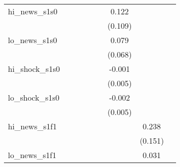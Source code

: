 {\begin{tabular}{l*{8}{c}}
\addlinespace
hi\_news\_s1s0&                     &                     &                     &                     &                     &       0.122         &                     &                     \\
            &                     &                     &                     &                     &                     &     (0.109)         &                     &                     \\
\addlinespace
lo\_news\_s1s0&                     &                     &                     &                     &                     &       0.079         &                     &                     \\
            &                     &                     &                     &                     &                     &     (0.068)         &                     &                     \\
\addlinespace
hi\_shock\_s1s0&                     &                     &                     &                     &                     &      -0.001         &                     &                     \\
            &                     &                     &                     &                     &                     &     (0.005)         &                     &                     \\
\addlinespace
lo\_shock\_s1s0&                     &                     &                     &                     &                     &      -0.002         &                     &                     \\
            &                     &                     &                     &                     &                     &     (0.005)         &                     &                     \\
\addlinespace
hi\_news\_s1f1&                     &                     &                     &                     &                     &                     &       0.238         &                     \\
            &                     &                     &                     &                     &                     &                     &     (0.151)         &                     \\
\addlinespace
lo\_news\_s1f1&                     &                     &                     &                     &                     &                     &       0.031         &                     \\

\end{tabular}}

